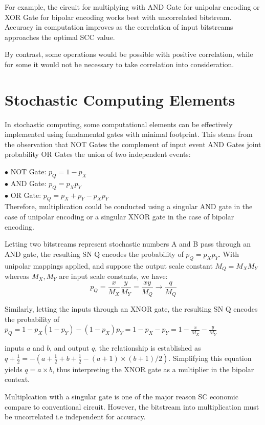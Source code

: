 For example, the circuit for multiplying with AND Gate for unipolar encoding or XOR Gate for bipolar encoding works best with uncorrelated bitstream. Accuracy in computation improves as the correlation of input bitstreams approaches the optimal SCC value.

By contrast, some operations would be possible with positive correlation, while for some it would not be necessary to take correlation into consideration. 


\section{Stochastic Computing Elements}
\label{sec:review:sec3}

In stochastic computing, some computational elements can be effectively implemented using fundamental gates with minimal footprint. This stems from the observation that NOT Gates  the complement of input event AND Gates joint probability OR Gates the union of two independent events:

$\bullet$ NOT Gate: $p_Q = 1 - p_X$ \\
$\bullet$ AND Gate: $p_Q = p_X p_Y$ \\
$\bullet$ OR Gate: $p_Q = p_X + p_Y - p_Xp_Y$ \\

Therefore, multiplication could be conducted using a singular AND gate in the case of unipolar encoding or a singular XNOR gate in the case of bipolar encoding. 

Letting two bitstreams represent stochastic numbers A and B pass through an AND gate, the resulting SN Q encodes the probability of $p_Q = p_X p_Y$. With unipolar mappings applied, and suppose the output scale constant $M_Q = M_X M_Y$ whereas $M_X, M_Y$ are input scale constants, we have: $$p_Q = \frac{x}{M_X}\frac{y}{M_Y} = \frac{xy}{M_Q}  \rightarrow  \frac{q}{M_Q}$$

Similarly, letting the inputs through an XNOR gate, the resulting SN Q encodes the probability of $p_Q = 1 - p_X (1-p_Y) - (1-p_X) p_Y = 1 - p_X - p_Y = 1 - \frac{x}{M_X} - \frac{y}{M_Y}$ 

inputs \(a\) and \(b\), and output \(q\), the relationship is established as \(q + \frac{1}{2} = -(a + \frac{1}{2} + b + \frac{1}{2} - (a + 1) \times (b + 1) / 2)\). Simplifying this equation yields \(q = a \times b\), thus interpreting the XNOR gate as a multiplier in the bipolar context.

Multiplcation with a singular gate is one of the major reason SC economic compare to conventional circuit. However, the bitstream into multiplication must be uncorrelated i.e independent for accuracy. 

